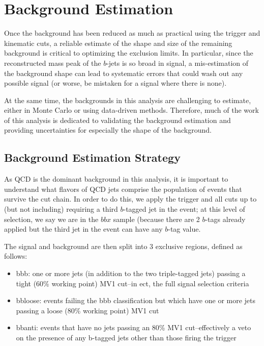  

\chapter[Background Estimation]{Background Estimation}

Once the background has been reduced as much as practical using the trigger and kinematic cuts,
a reliable estimate of the shape and size of the remaining background is critical to optimizing
the exclusion limits.  In particular, since the reconstructed mass peak of the $b$-jets is so
broad in signal, a mis-estimation of the background shape can lead to systematic errors that
could wash out any possible signal (or worse, be mistaken for a signal where there is none).  

At the same time, the backgrounds in this analysis are challenging to estimate, either in Monte
Carlo or using data-driven methods.  Therefore, much of the work of this analysis is dedicated
to validating the background estimation and providing uncertainties for especially the shape 
of the background.  

\section{Background Estimation Strategy}
As QCD is the dominant background in this analysis, it is important to understand
what flavors of QCD jets comprise the population of events that survive the cut
chain.  In order to do this, we apply the trigger and all cuts up to (but not including)
requiring a third $b$-tagged jet in the event; at this level of selection, we say
we are in the $bbx$ sample (because there are 2 $b$-tags already applied but the third
jet in the event can have any $b$-tag value.   

 The signal and background are then split into 3 exclusive regions, defined as follows:
\begin{itemize}
    \item bbb: one or more jets (in addition to the two triple-tagged jets) passing a tight (60\% working point)
 MV1 cut–in ect, the full signal selection criteria
    \item bbloose: events failing the bbb classification but which have one or more jets passing a loose (80\%
 working point) MV1 cut
    \item bbanti: events that have no jets passing an 80\% MV1 cut–effectively a veto on the presence of any
 b-tagged jets other than those firing the trigger
\end{itemize}


